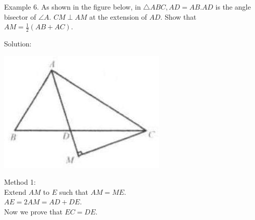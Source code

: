 \documentclass[10pt]{article}
\begin{document}
Example 6. As shown in the figure below, in \(\triangle A B C, A D=A B . A D\) is the angle bisector of \(\angle A\). \(C M \perp A M\) at the extension of \(A D\). Show that \(A M=\frac{1}{2}(A B+A C)\).

Solution:
\begin{center}
\includegraphics[max width=\textwidth]{2025_04_17_97bc1f7e44d93c271a88g-057(3)}
\end{center}

Method 1:\\
Extend \(A M\) to \(E\) such that \(A M=M E\).\\
\(A E=2 A M=A D+D E\).\\
Now we prove that \(E C=D E\).
\end{document}
